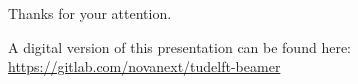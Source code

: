 \begin{frame}
    Thanks for your attention.
  
    A digital version of this presentation can be found here:
    \vfill
    \url{https://gitlab.com/novanext/tudelft-beamer} 
    \vfill  
    \centering
    \vfill
  \end{frame}